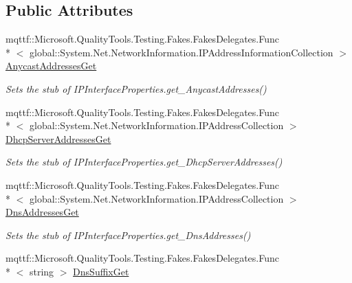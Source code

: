 \subsection*{Public Attributes}
\begin{DoxyCompactItemize}
\item 
mqttf\-::\-Microsoft.\-Quality\-Tools.\-Testing.\-Fakes.\-Fakes\-Delegates.\-Func\\*
$<$ global\-::\-System.\-Net.\-Network\-Information.\-I\-P\-Address\-Information\-Collection $>$ \hyperlink{class_system_1_1_net_1_1_network_information_1_1_fakes_1_1_stub_i_p_interface_properties_a995dc26ae56e249e9882ac3858bde2c7}{Anycast\-Addresses\-Get}
\begin{DoxyCompactList}\small\item\em Sets the stub of I\-P\-Interface\-Properties.\-get\-\_\-\-Anycast\-Addresses()\end{DoxyCompactList}\item 
mqttf\-::\-Microsoft.\-Quality\-Tools.\-Testing.\-Fakes.\-Fakes\-Delegates.\-Func\\*
$<$ global\-::\-System.\-Net.\-Network\-Information.\-I\-P\-Address\-Collection $>$ \hyperlink{class_system_1_1_net_1_1_network_information_1_1_fakes_1_1_stub_i_p_interface_properties_ad7502b2e55c51b73fa2f81482b52f49c}{Dhcp\-Server\-Addresses\-Get}
\begin{DoxyCompactList}\small\item\em Sets the stub of I\-P\-Interface\-Properties.\-get\-\_\-\-Dhcp\-Server\-Addresses()\end{DoxyCompactList}\item 
mqttf\-::\-Microsoft.\-Quality\-Tools.\-Testing.\-Fakes.\-Fakes\-Delegates.\-Func\\*
$<$ global\-::\-System.\-Net.\-Network\-Information.\-I\-P\-Address\-Collection $>$ \hyperlink{class_system_1_1_net_1_1_network_information_1_1_fakes_1_1_stub_i_p_interface_properties_abef34a387efd3de224aff622c76a3185}{Dns\-Addresses\-Get}
\begin{DoxyCompactList}\small\item\em Sets the stub of I\-P\-Interface\-Properties.\-get\-\_\-\-Dns\-Addresses()\end{DoxyCompactList}\item 
mqttf\-::\-Microsoft.\-Quality\-Tools.\-Testing.\-Fakes.\-Fakes\-Delegates.\-Func\\*
$<$ string $>$ \hyperlink{class_system_1_1_net_1_1_network_information_1_1_fakes_1_1_stub_i_p_interface_properties_ad1870a659497be7645823c7278647030}{Dns\-Suffix\-Get}

\end{DoxyCompactItemize}
